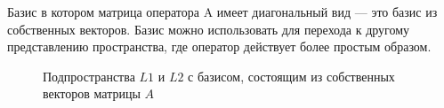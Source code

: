 \documentclass[12pt]{article}
\begin{document}
Базис в котором матрица оператора A имеет диагональный вид — это базис из собственных векторов. Базис можно использовать для перехода к другому представлению пространства, где оператор действует более простым образом.

\begin{figure}[h]
\centering
{}
\caption{Подпространства $L1$ и $L2$ с базисом, состоящим из собственных векторов матрицы $A$}
\end{figure}
\end{document}
